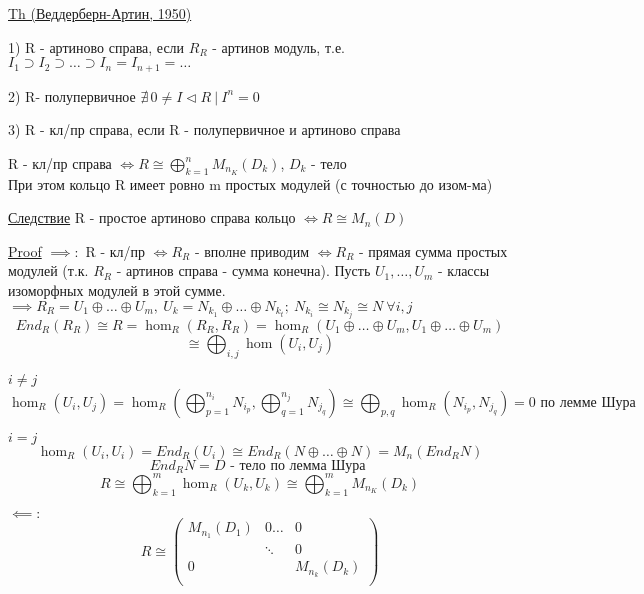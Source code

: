 \documentclass[a4paper]{article}
\begin{document}
\begin{tcolorbox}
\underline{Th (Веддерберн-Артин, 1950)}

1) R - артиново справа, если $ R_R $ - артинов модуль, т.е. $ I_1 \supset I_2 
\supset \dots \supset I_n = I_{n+1} = \dots$ 

2) R- полупервичное $ \nexists \, 0 \neq I \lhd R \ | \ I^{n} = 0 $ 

3) R - кл/пр справа, если R - полупервичное и артиново справа

R - кл/пр справа $ \iff R \cong \bigoplus_{k=1}^{n} M_{n_K}(D_k) $, $ D_k $ - тело\\
При этом кольцо R имеет ровно m простых модулей (с точностью до изом-ма)

\underline{Следствие} R - простое артиново справа кольцо $ \iff R \cong M_n(D) $ 

\underline{Proof} $ \implies: $ R - кл/пр $ \iff R_R $ - вполне приводим
$ \iff R_R $ - прямая сумма простых модулей (т.к. $ R_R $ - артинов справа - сумма
конечна). Пусть $ U_1, \dots, U_m $ - классы изоморфных модулей в этой сумме.
$ \implies R_R = U_1 \oplus \dots \oplus U_m, \ U_k = N_{k_1} \oplus \dots \oplus
N_{k_t}; \ N_{k_i} \cong N_{k_j} \cong N \ \forall i, j$ 
\[
    End_R(R_R) \cong R = \hom_R (R_R, R_R) = \hom_R(U_1 \oplus \dots \oplus U_m,U_1 \oplus \dots \oplus U_m)
\]
\[
    \cong \bigoplus_{i,j} \hom(U_i, U_j)
\]

\underline{$i \neq j$}
\[
    \hom_R(U_i, U_j) = \hom_R\left(\bigoplus_{p=1}^{n_i} N_{i_{p}}, \bigoplus_{q=1}^{n_j}
N_{j_q}\right) \cong \bigoplus_{p,q} \hom_R(N_{i_p}, N_{j_q}) = 0 \text{ по лемме Шура}
\]

\underline{$i = j$}
\[
    \hom_R (U_i, U_i) = End_R(U_i) \cong End_R(N \oplus \dots \oplus N) = M_n(End_R N)
\]
\[
    End_R N = D \text{ - тело по лемма Шура }
\]
\[
    R \cong \bigoplus_{k=1}^{m}\hom_R(U_k, U_k) \cong\bigoplus_{k=1}^{m} M_{n_K}(D_k)
\]

$ \impliedby: $ 
\[
    R \cong
    \begin{pmatrix}
    M_{n_1}(D_1) & 0\dots & 0\\
     & \ddots & 0 \\
     0&  & M_{n_k}(D_k) \\
    
    \end{pmatrix}
\]

\end{tcolorbox}
\end{document}
